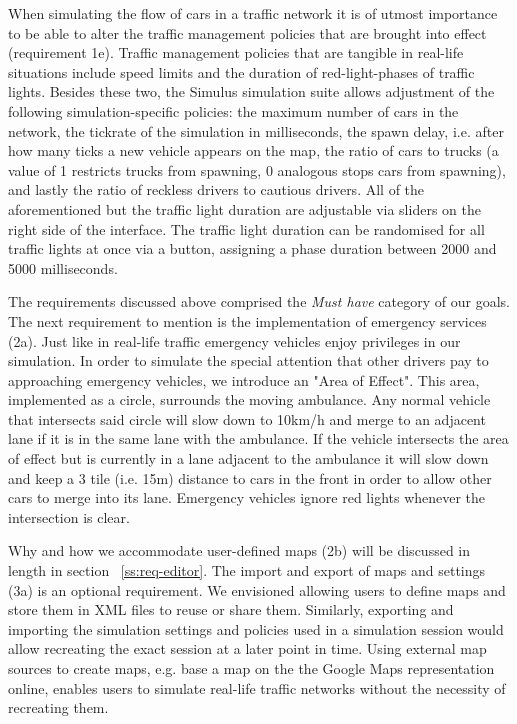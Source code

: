 When simulating the flow of cars in a traffic network it is of utmost importance to be able to alter the traffic management policies that are brought into effect (requirement 1e). Traffic management policies that are tangible in real-life situations include speed limits and the duration of red-light-phases of traffic lights. Besides these two, the Simulus simulation suite allows adjustment of the following simulation-specific policies: the maximum number of cars in the network, the tickrate of the simulation in milliseconds, the spawn delay, i.e. after how many ticks a new vehicle appears on the map, the ratio of cars to trucks (a value of 1 restricts trucks from spawning, 0 analogous stops cars from spawning), and lastly the ratio of reckless drivers to cautious drivers. All of the aforementioned but the traffic light duration are adjustable via sliders on the right side of the interface. The traffic light duration can be randomised for all traffic lights at once via a button, assigning a phase duration between 2000 and 5000 milliseconds.

The requirements discussed above comprised the \textit{Must have} category of our goals. The next requirement to mention is the implementation of emergency services (2a). Just like in real-life traffic emergency vehicles enjoy privileges in our simulation. In order to simulate the special attention that other drivers pay to approaching emergency vehicles, we introduce an "Area of Effect". This area, implemented as a circle, surrounds the moving ambulance. Any normal vehicle that intersects said circle will slow down to 10km/h and merge to an adjacent lane if it is in the same lane with the ambulance. If the vehicle intersects the area of effect but is currently in a lane adjacent to the ambulance it will slow down and keep a 3 tile (i.e. 15m) distance to cars in the front in order to allow other cars to merge into its lane. Emergency vehicles ignore red lights whenever the intersection is clear.

Why and how we accommodate user-defined maps (2b) will be discussed in length in section ~\ref{ss:req-editor}. The import and export of maps and settings (3a) is an optional requirement. We envisioned allowing users to define maps and store them in XML files to reuse or share them. Similarly, exporting and importing the simulation settings and policies used in a simulation session would allow recreating the exact session at a later point in time. Using external map sources to create maps, e.g. base a map on the the Google Maps representation online, enables users to simulate real-life traffic networks without the necessity of recreating them.

